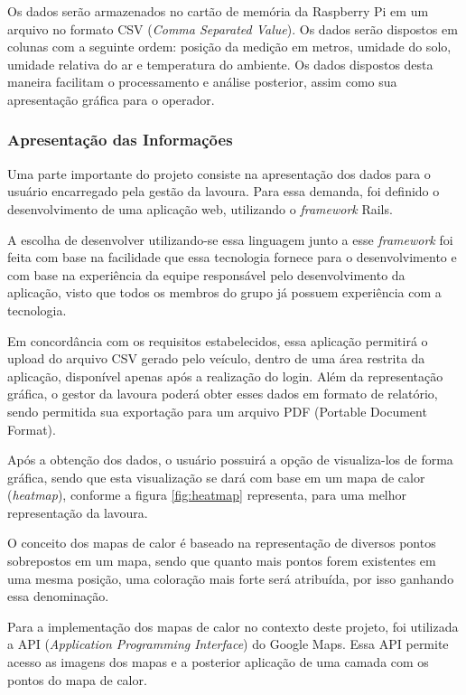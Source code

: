  Os dados serão armazenados no cartão de memória da Raspberry Pi
  em um arquivo no formato CSV (\textit{Comma Separated Value}). Os dados
  serão dispostos em colunas com a seguinte ordem: posição da medição
  em metros, umidade do solo, umidade relativa do ar e temperatura do
  ambiente.
  Os dados dispostos desta maneira facilitam o processamento e
  análise posterior, assim como sua apresentação gráfica para
  o operador.

  \subsubsection{Apresentação das Informações}

  Uma parte importante do projeto consiste na apresentação dos
  dados para o usuário encarregado pela gestão da lavoura. Para essa demanda,
  foi definido o desenvolvimento de uma aplicação web, utilizando
  o \textit{framework} Rails.

  A escolha de desenvolver utilizando-se essa linguagem junto a
  esse \textit{framework} foi feita com base na facilidade que essa
  tecnologia fornece para o desenvolvimento e com base na experiência
  da equipe responsável pelo desenvolvimento da aplicação, visto que
  todos os membros do grupo já possuem experiência com a tecnologia.

  Em concordância com os requisitos estabelecidos, essa aplicação
  permitirá o upload do arquivo CSV gerado pelo veículo, dentro de
  uma área restrita da aplicação, disponível apenas após a realização
  do login.
  Além da representação gráfica, o gestor da lavoura poderá obter
  esses dados em formato de relatório, sendo permitida sua
  exportação para um arquivo PDF (Portable Document Format).

  \vfill
  \pagebreak

  Após a obtenção dos dados, o usuário possuirá a opção de visualiza-los de forma gráfica, sendo que esta visualização se dará
  com base em um mapa de calor (\textit{heatmap}), conforme a figura \ref{fig:heatmap} representa, para uma melhor representação da lavoura.

  O conceito dos mapas de calor é baseado na representação de diversos pontos sobrepostos em um mapa, sendo que quanto mais pontos
  forem existentes em uma mesma posição, uma coloração mais forte será atribuída, por isso ganhando essa denominação.

  Para a implementação dos mapas de calor no contexto deste projeto, foi utilizada a API (\textit{Application Programming Interface})
  do Google Maps. Essa API permite acesso as imagens dos mapas e a posterior aplicação de uma camada com os pontos do mapa de calor.

